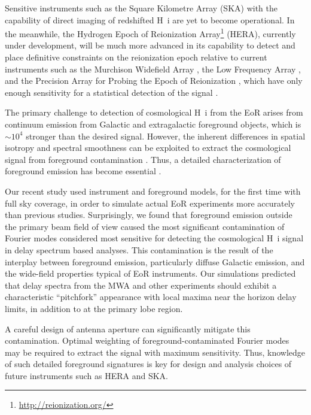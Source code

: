 \documentclass[preprint2,apjl,numberedappendix,twocolappendix,appendixfloats]{emulateapj}
\begin{document}
Sensitive instruments such as the Square Kilometre Array (SKA) with the capability of direct imaging of redshifted H~{\sc i} are yet to become operational. In the meanwhile, the Hydrogen Epoch of Reionization Array\footnote{\url{http://reionization.org/}} (HERA), currently under development, will be much more advanced in its capability to detect and place definitive constraints on the reionization epoch relative to current instruments such as the Murchison Widefield Array \citep[MWA;][]{lon09,tin13,bow13}, the Low Frequency Array \citep[LOFAR;][]{van13}, and the Precision Array for Probing the Epoch of Reionization \citep[PAPER;][]{par10}, which have only enough sensitivity for a statistical detection of the signal \citep{bow06,par12a,bea13,dil13,thy13,pob14}.

The primary challenge to detection of cosmological H~{\sc i} from the EoR arises from continuum emission from Galactic and extragalactic foreground objects, which is $\sim 10^4$ stronger than the desired signal. However, the inherent differences in spatial isotropy and spectral smoothness can be exploited to extract the cosmological signal from foreground contamination \citep[see, e.g.,][]{dim02,dim04,zal04,fur04,mor04,san05,fur06,mcq06,mor06,wan06,gle08}. Thus, a detailed characterization of foreground emission has become essential \citep{ali08,bow09,liu09,ber09,ber10,dat10,liu11,gho12,mor12,par12b,tro12,pob13,dil13,dil14,liu14a,liu14b,thy13,thy15}.

Our recent study \citep[][hereafter referred to as Paper~I]{thy15} used instrument and foreground models, for the first time with full sky coverage, in order to simulate actual EoR experiments more accurately than previous studies. Surprisingly, we found that foreground emission outside the primary beam field of view caused the most significant contamination of Fourier modes considered most sensitive for detecting the cosmological H~{\sc i} signal in delay spectrum based analyses. This contamination is the result of the interplay between foreground emission, particularly diffuse Galactic emission, and the wide-field properties typical of EoR instruments. Our simulations predicted that delay spectra from the MWA and other experiments should exhibit a characteristic ``pitchfork'' appearance with local maxima near the horizon delay limits, in addition to at the primary lobe region.  

A careful design of antenna aperture can significantly mitigate this contamination. Optimal weighting of foreground-contaminated Fourier modes may be required to extract the signal with maximum sensitivity. Thus, knowledge of such detailed foreground signatures is key for design and analysis choices of future instruments such as HERA and SKA.
\end{document}
